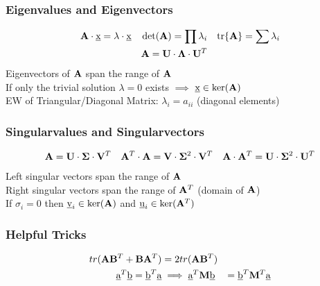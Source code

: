 \begin{mdframed}[style=eqbox]
\subsubsection{Eigenvalues and Eigenvectors}
\begin{align*}
  \mathbf{A} \cdot \underbar{x} = \lambda \cdot \underbar{x} && \det(\mathbf{A}) = \prod \lambda_i && \text{tr}\{\mathbf{A}\} = \sum \lambda_i\\
  &&\mathbf{A} = \mathbf{U} \cdot \mathbf{\Lambda} \cdot \mathbf{U}^{T}&&
\end{align*}
Eigenvectors of $\mathbf{A}$ span the range of $\mathbf{A}$\\
If only the trivial solution $\lambda = 0$ exists $\implies$ $\underbar{x} \in \text{ker}(\mathbf{A})$\\[0.25em]
EW of Triangular/Diagonal Matrix: $\lambda_i = a_{ii}$ (diagonal elements)

\subsubsection{Singularvalues and Singularvectors}
\begin{align*}
  \mathbf{A} = \mathbf{U} \cdot \mathbf{\Sigma} \cdot \mathbf{V}^{T} && \mathbf{A}^{T} \cdot \mathbf{A} = \mathbf{V} \cdot \mathbf{\Sigma}^{2} \cdot \mathbf{V}^{T} && \mathbf{A} \cdot \mathbf{A}^{T} = \mathbf{U} \cdot \mathbf{\Sigma}^{2} \cdot \mathbf{U}^{T}
\end{align*}
Left singular vectors span the range of $\mathbf{A}$\\
Right singular vectors span the range of $\mathbf{A}^{T}$ (domain of $\mathbf{A}$)\\
If $\sigma_i = 0$ then $\underbar{v}_i \in \text{ker}(\mathbf{A})$ and $\underbar{u}_i \in \text{ker}(\mathbf{A}^{T})$

\subsubsection{Helpful Tricks}
\vspace*{-10pt}
\begin{align*}
  tr(\mathbf{A}\mathbf{B}^T + \mathbf{B}\mathbf{A}^T) &= 2tr(\mathbf{A}\mathbf{B}^T)\\
  \underbar{a}^T\underbar{b} = \underbar{b}^T\underbar{a} &\implies \underbar{a}^T \mathbf{M} \underbar{b} &= \underbar{b}^T \mathbf{M}^T \underbar{a}
\end{align*}
\end{mdframed}

\newpage
